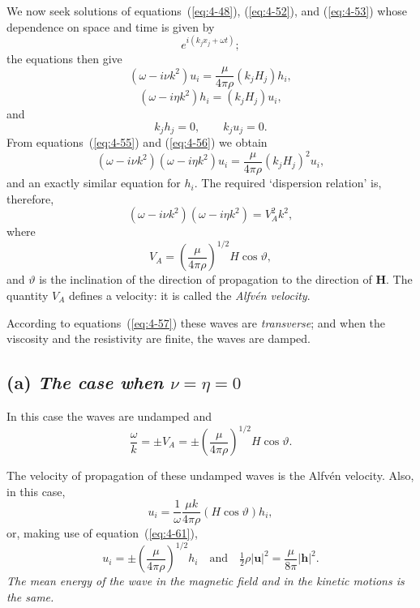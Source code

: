 We now seek solutions of equations~(\ref{eq:4-48}), (\ref{eq:4-52}), and (\ref{eq:4-53}) whose dependence on space and time is given by
\begin{equation}
\label{eq:4-54}
e^{i(k_j x_j+\omega t)};
\end{equation}
the equations then give
\begin{equation}
\label{eq:4-55}
(\omega-i\nu k^2)u_i = \frac{\mu}{4\pi\rho}(k_j H_j)h_i,
\end{equation}
\begin{equation}
\label{eq:4-56}
(\omega-i\eta k^2)h_i = (k_j H_j)u_i,
\end{equation}
and
\begin{equation}
\label{eq:4-57}
k_j h_j = 0, \qquad k_j u_j = 0.
\end{equation}
From equations~(\ref{eq:4-55}) and (\ref{eq:4-56}) we obtain
\begin{equation}
\label{eq:4-58}
(\omega-i\nu k^2)(\omega-i\eta k^2)u_i = \frac{\mu}{4\pi\rho}(k_j H_j)^2 u_i,
\end{equation}
and an exactly similar equation for $h_i$. The required `dispersion relation' is, therefore,
\begin{equation}
\label{eq:4-59}
(\omega-i\nu k^2)(\omega-i\eta k^2) = V^2_A k^2,
\end{equation}
where
\begin{equation}
\label{eq:4-60}
V_A = \left(\frac{\mu}{4\pi\rho}\right)^{\!1/2}\!H\cos\vartheta,
\end{equation}
and $\vartheta$ is the inclination of the direction of propagation to the direction of $\mathbf{H}$. The quantity $V_A$ defines a velocity: it is called the \emph{Alfv\'en velocity}.

According to equations~(\ref{eq:4-57}) these waves are \emph{transverse}; and when the viscosity and the resistivity are finite, the waves are damped.

\subsection*{(a) \emph{The case when $\nu=\eta=0$}}

In this case the waves are undamped and
\begin{equation}
\label{eq:4-61}
\frac{\omega}{k} = \pm V_A = \pm\left(\frac{\mu}{4\pi\rho}\right)^{\!1/2}\!H\cos\vartheta.
\end{equation}

The velocity of propagation of these undamped waves is the Alfv\'en velocity. Also, in this case,
\begin{equation}
\label{eq:4-62}
u_i = \frac{1}{\omega}\frac{\mu k}{4\pi\rho}(H\cos\vartheta)h_i,
\end{equation}
or, making use of equation~(\ref{eq:4-61}),
\begin{equation}
\label{eq:4-63}
u_i = \pm\left(\frac{\mu}{4\pi\rho}\right)^{\!1/2}\!h_i \quad \text{and} \quad \tfrac{1}{2}\rho|\mathbf{u}|^2 = \frac{\mu}{8\pi}|\mathbf{h}|^2.
\end{equation}
\emph{The mean energy of the wave in the magnetic field and in the kinetic motions is the same.}

